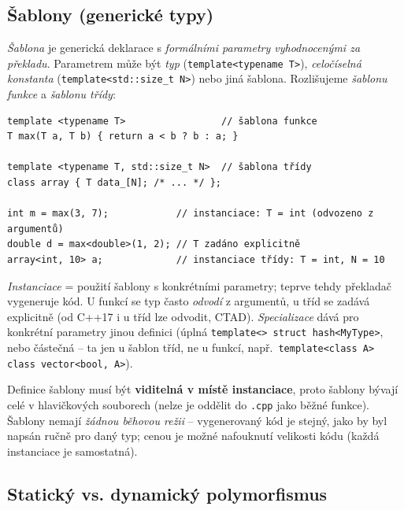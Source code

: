 \documentclass[11pt,a4paper]{article}
\newcommand{\cd}{\lstinline[style=cpp]}
\begin{document}
\subsection{Šablony (generické typy)}

\begin{definice}[Šablona]
\emph{Šablona} je generická deklarace s \emph{formálními parametry vyhodnocenými za překladu}. Parametrem může být \emph{typ} (\cd{template<typename T>}), \emph{celočíselná konstanta} (\cd{template<std::size_t N>}) nebo jiná šablona. Rozlišujeme \emph{šablonu funkce} a \emph{šablonu třídy}:
\end{definice}

\begin{lstlisting}[style=cpp]
template <typename T>                 // šablona funkce
T max(T a, T b) { return a < b ? b : a; }

template <typename T, std::size_t N>  // šablona třídy
class array { T data_[N]; /* ... */ };

int m = max(3, 7);            // instanciace: T = int (odvozeno z argumentů)
double d = max<double>(1, 2); // T zadáno explicitně
array<int, 10> a;             // instanciace třídy: T = int, N = 10
\end{lstlisting}

\begin{definice}
\emph{Instanciace} = použití šablony s konkrétními parametry; teprve tehdy překladač vygeneruje kód. U funkcí se typ často \emph{odvodí} z argumentů, u tříd se zadává explicitně (od C++17 i u tříd lze odvodit, CTAD). \emph{Specializace} dává pro konkrétní parametry jinou definici (úplná \cd{template<> struct hash<MyType>}, nebo částečná -- ta jen u šablon tříd, ne u funkcí, např.\ \cd{template<class A> class vector<bool, A>}).
\end{definice}

\begin{poznamka}
Definice šablony musí být \textbf{viditelná v místě instanciace}, proto šablony bývají celé v hlavičkových souborech (nelze je oddělit do \texttt{.cpp} jako běžné funkce). Šablony nemají \emph{žádnou běhovou režii} -- vygenerovaný kód je stejný, jako by byl napsán ručně pro daný typ; cenou je možné nafouknutí velikosti kódu (každá instanciace je samostatná).
\end{poznamka}

\subsection{Statický vs. dynamický polymorfismus}
\end{document}
